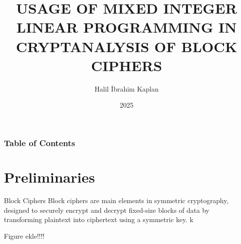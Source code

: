 \documentclass{beamer}
\title[MILP IN
CRYPTANALYSIS ] %
{USAGE OF MIXED INTEGER
LINEAR PROGRAMMING IN
CRYPTANALYSIS OF BLOCK
CIPHERS}
\author[Halil İbrahim Kaplan] %
{Halil İbrahim Kaplan }
\institute[] %
{
  Istanbul Technical University\\
  Informatics Institute
}
\date[2025] %
{2025}
\begin{document}
\frame{\titlepage}


\begin{frame}
\frametitle{Table of Contents}
\tableofcontents
\end{frame}
\section{Preliminaries}

\begin{frame}{Block Ciphers}
    Block ciphers are main elements in symmetric cryptography, designed to securely
encrypt and decrypt fixed-size blocks of data by transforming plaintext into ciphertext
using a symmetric key. 
k   

Figure ekle!!!!
\end{frame}
\end{document}
